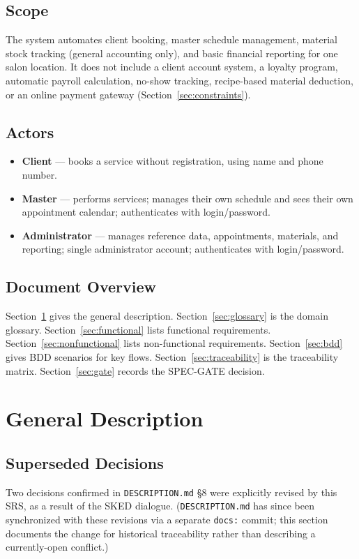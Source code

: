 \documentclass[11pt,a4paper]{article}
\begin{document}
\subsection{Scope}
The system automates client booking, master schedule management, material
stock tracking (general accounting only), and basic financial reporting for
one salon location. It does not include a client account system, a loyalty
program, automatic payroll calculation, no-show tracking, recipe-based
material deduction, or an online payment gateway (Section~\ref{sec:constraints}).

\subsection{Actors}
\begin{itemize}[leftmargin=1.2cm]
  \item \textbf{Client} --- books a service without registration, using
    name and phone number.
  \item \textbf{Master} --- performs services; manages their own schedule
    and sees their own appointment calendar; authenticates with login/password.
  \item \textbf{Administrator} --- manages reference data, appointments,
    materials, and reporting; single administrator account; authenticates
    with login/password.
\end{itemize}

\subsection{Document Overview}
Section~\ref{sec:general} gives the general description. Section~\ref{sec:glossary}
is the domain glossary. Section~\ref{sec:functional} lists functional
requirements. Section~\ref{sec:nonfunctional} lists non-functional
requirements. Section~\ref{sec:bdd} gives BDD scenarios for key flows.
Section~\ref{sec:traceability} is the traceability matrix.
Section~\ref{sec:gate} records the SPEC-GATE decision.

\section{General Description}
\label{sec:general}

\subsection{Superseded Decisions}
\label{sec:superseded}
Two decisions confirmed in \texttt{DESCRIPTION.md} \S8 were explicitly
revised by this SRS, as a result of the SKED dialogue. (\texttt{DESCRIPTION.md}
has since been synchronized with these revisions via a separate
\texttt{docs:} commit; this section documents the change for historical
traceability rather than describing a currently-open conflict.)
\end{document}
